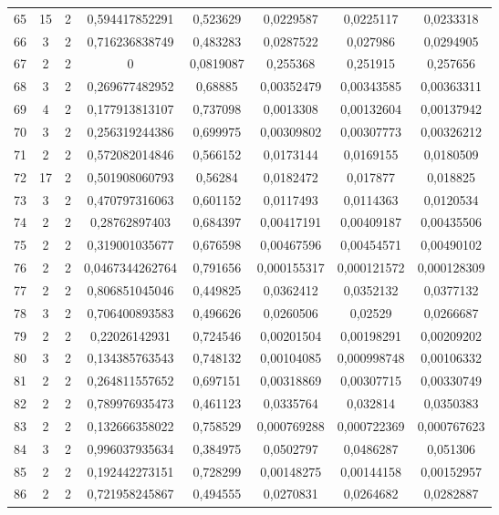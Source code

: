 \begin{longtable}{|c|c|c|c|c|c|c|c|}
65 & 15 & 2 & 0,594417852291 & 0,523629 & 0,0229587 & 0,0225117 & 0,0233318  \\
66 & 3 & 2 & 0,716236838749 & 0,483283 & 0,0287522 & 0,027986 & 0,0294905  \\
67 & 2 & 2 & 0 & 0,0819087 & 0,255368 & 0,251915 & 0,257656  \\
68 & 3 & 2 & 0,269677482952 & 0,68885 & 0,00352479 & 0,00343585 & 0,00363311  \\
69 & 4 & 2 & 0,177913813107 & 0,737098 & 0,0013308 & 0,00132604 & 0,00137942  \\
70 & 3 & 2 & 0,256319244386 & 0,699975 & 0,00309802 & 0,00307773 & 0,00326212  \\
71 & 2 & 2 & 0,572082014846 & 0,566152 & 0,0173144 & 0,0169155 & 0,0180509  \\
72 & 17 & 2 & 0,501908060793 & 0,56284 & 0,0182472 & 0,017877 & 0,018825  \\
73 & 3 & 2 & 0,470797316063 & 0,601152 & 0,0117493 & 0,0114363 & 0,0120534  \\
74 & 2 & 2 & 0,28762897403 & 0,684397 & 0,00417191 & 0,00409187 & 0,00435506  \\
75 & 2 & 2 & 0,319001035677 & 0,676598 & 0,00467596 & 0,00454571 & 0,00490102  \\
76 & 2 & 2 & 0,0467344262764 & 0,791656 & 0,000155317 & 0,000121572 & 0,000128309  \\
77 & 2 & 2 & 0,806851045046 & 0,449825 & 0,0362412 & 0,0352132 & 0,0377132  \\
78 & 3 & 2 & 0,706400893583 & 0,496626 & 0,0260506 & 0,02529 & 0,0266687  \\
79 & 2 & 2 & 0,22026142931 & 0,724546 & 0,00201504 & 0,00198291 & 0,00209202  \\
80 & 3 & 2 & 0,134385763543 & 0,748132 & 0,00104085 & 0,000998748 & 0,00106332  \\
81 & 2 & 2 & 0,264811557652 & 0,697151 & 0,00318869 & 0,00307715 & 0,00330749  \\
82 & 2 & 2 & 0,789976935473 & 0,461123 & 0,0335764 & 0,032814 & 0,0350383  \\
83 & 2 & 2 & 0,132666358022 & 0,758529 & 0,000769288 & 0,000722369 & 0,000767623  \\
84 & 3 & 2 & 0,996037935634 & 0,384975 & 0,0502797 & 0,0486287 & 0,051306  \\
85 & 2 & 2 & 0,192442273151 & 0,728299 & 0,00148275 & 0,00144158 & 0,00152957  \\
86 & 2 & 2 & 0,721958245867 & 0,494555 & 0,0270831 & 0,0264682 & 0,0282887  \\

\end{longtable}
